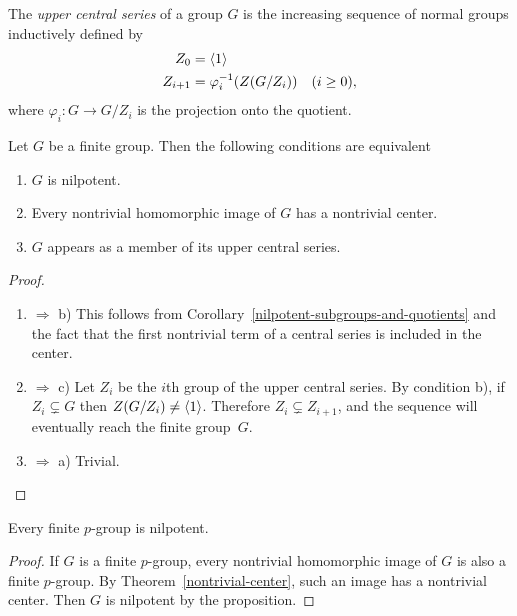\begin{defn}
    The \textsl{upper central series} of a group $G$ is the increasing sequence of normal groups inductively defined by
    \begin{align*}
        Z_0 &=\langle1\rangle\\
        Z_{i+1} &=\varphi_i^{-1}(Z(G/Z_i))\quad(i\ge0),
    \end{align*}
    where $\varphi_i\colon G\to G/Z_i$ is the projection onto the quotient.
\end{defn}

\begin{prop}\label{nilpotent-center-series}
    Let $G$ be a finite group. Then the following conditions are equivalent
    \begin{enumerate}[\rm a)]
    \item $G$ is nilpotent.
    \item Every nontrivial homomorphic image of\/ $G$ has a nontrivial center.
    \item $G$ appears as a member of its upper central series.
    \end{enumerate}
\end{prop}

\begin{proof}${}$
\begin{enumerate}[\rm a)]
    \item $\Rightarrow$ b) This follows from Corollary~\ref{nilpotent-subgroups-and-quotients} and the fact that the first nontrivial term of a central series is included in the center.
    \item $\Rightarrow$ c) Let $Z_i$ be the $i$th group of the upper central series. By condition b), if $Z_i\varsubsetneq G$ then $Z(G/Z_i)\ne\langle1\rangle$. Therefore $Z_i\varsubsetneq Z_{i+1}$, and the sequence will eventually reach the finite group~$G$.
    \item $\Rightarrow$ a) Trivial.
\end{enumerate}
\end{proof}


\begin{cor}\label{p-groups-are-nilpotent}
    Every finite $p$-group is nilpotent.
\end{cor}

\begin{proof} If $G$ is a finite $p$-group, every nontrivial homomorphic image of $G$ is also a finite $p$-group. By Theorem~\ref{nontrivial-center}, such an image has a nontrivial center. Then $G$ is nilpotent by the proposition.  \end{proof}

